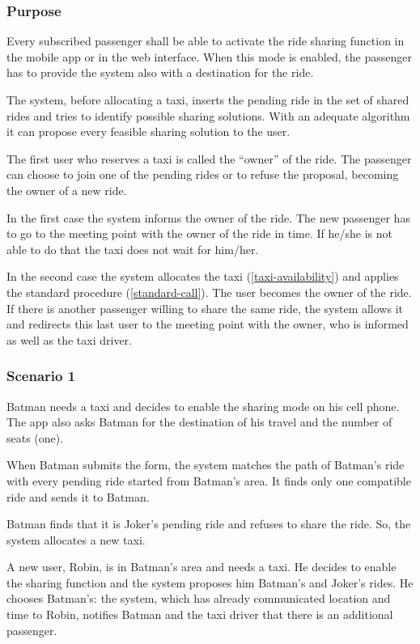 \label{ride-sharing}
\subsubsection{Purpose}

Every subscribed passenger shall be able to activate the ride sharing function in the mobile app or in the web interface. When this mode is enabled, the passenger has to provide the system also with a destination for the ride.

The system, before allocating a taxi, inserts the pending ride in the set of shared rides and tries to identify possible sharing solutions.
With an adequate algorithm it can propose every feasible sharing solution to the user.

The first user who reserves a taxi is called the ``owner'' of the ride.
The passenger can choose to join one of the pending rides or to refuse the proposal, becoming the owner of a new ride.

In the first case the system informs the owner of the ride. The new passenger has to go to the meeting point with the owner of the ride in time. If he/she is not able to do that the taxi does not wait for him/her.

In the second case the system allocates the taxi (\ref{taxi-availability}) and applies the standard procedure (\ref{standard-call}).  The user becomes the owner of the ride.
If there is another passenger willing to share the same ride, the system allows it and redirects this last user to the meeting point with the owner, who is informed as well as the taxi driver.

\subsubsection{Scenario 1}
Batman needs a taxi and decides to enable the sharing mode on his cell phone. The app also asks Batman for the destination of his travel and the number of seats (one).

When Batman submits the form, the system matches the path of Batman's ride with every pending ride started from Batman's area. It finds only one compatible ride and sends it to Batman.

Batman finds that it is Joker's pending ride and refuses to share the ride.
So, the system allocates a new taxi.

A new user, Robin, is in Batman's area and needs a taxi. He decides to enable the sharing function and the system proposes him Batman's and Joker's rides.
He chooses Batman's: the system, which has already communicated location and time to Robin, notifies Batman and the taxi driver that there is an additional passenger.

